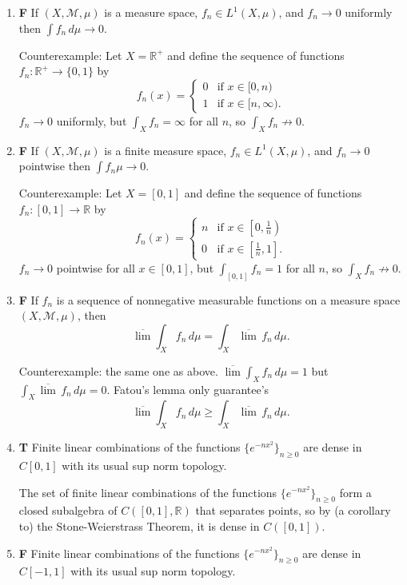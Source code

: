 \documentclass[11pt,oneside,english]{amsart}
\theoremstyle{definition}
\newcommand{\MC}[1]{\mathcal{#1}}
\newcommand{\MB}[1]{\mathbb{#1}}
\begin{document}
\begin{enumerate}
\item  \textbf{F}
If $(X,\MC{M},\mu)$ is a measure space, $f_n \in L^1(X,\mu)$, and $f_n \to 0$ uniformly then $\int f_n\, d\mu \to 0$.

Counterexample: Let $X=\MB{R}^+$ and define the sequence of functions $f_n:\MB{R}^+\rightarrow\{0,1\}$ by
\[
f_n(x)=\begin{cases}0 & \text{if }x\in[0,n)\\ 1 & \text{if }x\in[n,\infty).\end{cases}
\]
$f_n\to0$ uniformly, but $\int_Xf_n=\infty$ for all $n$, so $\int_Xf_n\not\to0$.

\item \textbf{F}
If $(X,\MC{M},\mu)$ is a finite measure space, $f_n \in L^1(X,\mu)$, and $f_n \to 0$ pointwise then $\int f_n \mu \to 0$.

Counterexample: Let $X=[0,1]$ and define the sequence of functions $f_n:[0,1]\to\MB{R}$ by
\[
f_n(x)=\begin{cases}n & \text{if }x\in\left[0,\frac{1}{n}\right)\\ 0 & \text{if }x\in\left[\frac{1}{n},1\right].\end{cases}
\]
$f_n\to0$ pointwise for all $x\in[0,1]$, but $\int_{[0,1]}f_n=1$ for all $n$, so $\int_Xf_n\not\to0$.


\item \textbf{F}
If $f_n$ is a sequence of nonnegative measurable functions on a measure space $(X,\MC{M},\mu)$, then
\[  \overline{\lim} \int_X f_n\, d\mu = \int_X \overline{\lim}\, f_n\,d\mu. \]



Counterexample: the same one as above. $\overline{\lim} \int_X f_n\, d\mu=1$ but $\int_X \overline{\lim}\, f_n\,d\mu=0$. Fatou's lemma only guarantee's 
\[  \overline{\lim} \int_X f_n\, d\mu \geq \int_X \overline{\lim}\, f_n\,d\mu. \]

\item \textbf{T}
Finite linear combinations of the functions $\{e^{-nx^2}\}_{n \geq 0}$ are dense in $C[0,1]$ with its usual sup norm topology.

The set of finite linear combinations of the functions $\{e^{-nx^2}\}_{n \geq 0}$ form a closed subalgebra of $C([0,1],\MB{R})$ that separates points, so by (a corollary to) the Stone-Weierstrass Theorem, it is dense in $C([0,1])$.

\item \textbf{F}
Finite linear combinations of the functions $\{e^{-nx^2}\}_{n \geq 0}$ are dense in $C[-1,1]$ with its usual sup norm topology. 


\end{enumerate}
\end{document}

